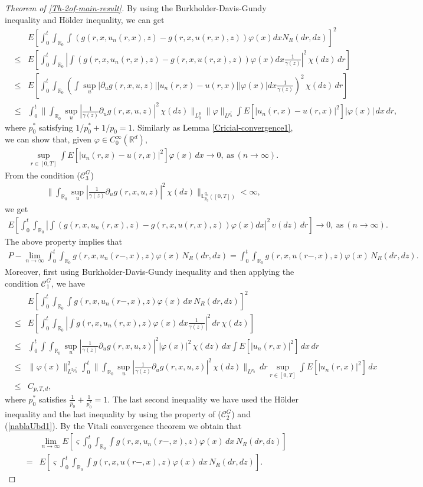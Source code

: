 \documentclass[12pt,oneside, reqno]{amsart}
\newcommand{\be}{\begin{eqnarray}}
\newcommand{\ee}{\end{eqnarray}}
\newcommand{\ce}{\begin{eqnarray*}}
\newcommand{\de}{\end{eqnarray*}}
\def\mL{{\mathbb L}}
\def\mR{{\mathbb R}}
\def\sC{{\mathscr C}}
\def\leq{\leqslant}
\numberwithin{equation}{section}
\begin{document}
\begin{proof}[Theorem of \ref{Th-2of-main-result}]
By 	using the Burkholder-Davis-Gundy inequality and H\"{o}lder inequality, we can get
\ce 
&&E\left[\int_0^t\int _{\mR_0}\int(g(r,x,u_n(r,x),z)-g(r,x,u(r,x),z))\varphi(x)dxN_R(dr,dz)\right]^2\\
&\leq&E\left[\int_0^t\int _{\mR_0}\left|\int(g(r,x,u_n(r,x),z)-g(r,x,u(r,x),z))\varphi(x)dx\frac{1}{\gamma(z)}\right|^2\,\chi(dz)\, dr\right]\\
&\leq&E\left[\int_0^t\int _{\mR_0}\left(\int\sup_u|\partial_u g(r,x,u,z)||u_n(r,x)-u(r,x)||\varphi(x)|dx\frac{1}{\gamma(z)}\right)^2\,\chi(dz)\, dr\right]\\
&\leq &\int_0^t\big\| \int _{\mR_0}\sup_u|\frac{1}{\gamma(z)}\partial_u g(r,x,u,z)|^2\,\chi(dz)\big\|_{L^p_0}\|\varphi\|_{L^{p_0^*}}\int E[|u_n(r,x)-u(r,x)|^2]|\varphi(x)|\,dx\, dr,
\de 
where $p_0^*$ satisfying $1/{p_0^*}+1/{p_0}=1$. Similarly as Lemma \ref{Cricial-convergence1}, we can show that, given $\varphi\in C_0^{\infty}(\mR^d)$, 
\be\label{weck-convergece1+1}
\sup_{r\in [0,T]}\int E[|u_n(r,x)-u(r,x)|^2]\varphi(x)\,dx\to 0,~\mbox{as}~(n\to\infty).
\ee 
From the condition ($\sC_3^G$)
\ce 
\big\| \int _{\mR_0}\sup_u|\frac{1}{\gamma(z)}\partial_u g(r,x,u,z)|^2\,\chi(dz)\big\|_{\mL_{p_0}^{q_0}([0,T])}<\infty,
\de 
 we get 
\ce 
E\left [\int_0^t\int _{\mR_0}\left |\int(g(r,x,u_n(r,x),z)-g(r,x,u(r,x),z))\varphi(x)dx\right|^2\,\upsilon(dz)\, dr\right]\to 0,~\mbox{as}~(n\to\infty).
\de 
The above property implies that 
\ce 
P-\lim_{n\to\infty} \int_0^t\int _{\mR_0} g(r,x,u_n(r-,x),z)\varphi(x)\,N_R(dr,dz)=\int_0^t\int _{\mR_0}g(r,x,u(r-,x),z)\varphi(x)\,N_R(dr,dz).
\de 
Moreover, first using Burkholder-Davis-Gundy inequality and then applying the condition $\sC_1^G$, we have 
\ce  
&&E\left[\int_0^t\int _{\mR_0}\int g(r,x,u_n(r-,x),z)\varphi(x)\,dx\,N_R(dr,dz)\right]^2\\
&\leq&E\left[\int_0^t\int _{\mR_0}\left|\int g(r,x,u_n(r,x),z)\varphi(x)\,dx\frac{1}{\gamma(z)}\right|^2\,dr\,\chi(dz)\right]\\
&\leq&\int_0^t\int\int_{\mR_0} \sup_{u}|\frac{1}{\gamma(z)}\partial_u g(r,x,u,z)|^2|\varphi(x)|^2\,\chi(dz)\,dx\int E[|u_n(r,x)|^2]\,dx\,dr\\
&\leq&\|\varphi(x)\|_{L^{2p_0^*}}^2\int_0^t\big\|\int_{\mR_0} \sup_{u}|\frac{1}{\gamma(z)}\partial_u g(r,x,u,z)|^2\,\chi(dz)\big\|_{L^{p_0}}\,dr\sup_{r\in[0,T]}\int E[|u_n(r,x)|^2]\,dx\\
&\leq&C_{p,T,d},
\de 
where $p_0^*$ satisfies $\frac{1}{p_0}+\frac{1}{p_0^*}=1$. The last second inequality we have used the H\"{o}lder inequality and the last inequality by using the property of ($\sC_2^G$) and (\ref{nablaUbd1}).
By the Vitali convergence theorem we obtain that 
\ce 
&&\lim_{n\to \infty}E\left[\varsigma\int_0^t\int _{\mR_0}\int g(r,x,u_n(r-,x),z)\varphi(x)\,dx\,N_R(dr,dz)\right]\\
&=&E\left[\varsigma\int_0^t\int _{\mR_0}\int g(r,x,u(r-,x),z)\varphi(x)\,dx\,N_R(dr,dz)\right].
\de 


\end{proof}
\end{document}

